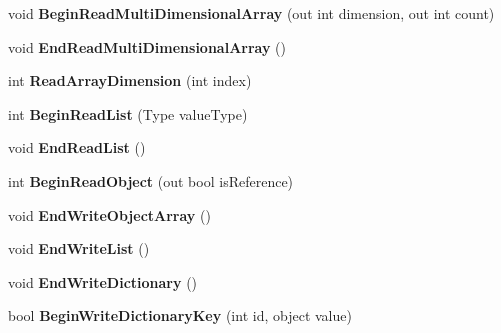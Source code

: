\begin{DoxyCompactItemize}
void {\bfseries Begin\+Read\+Multi\+Dimensional\+Array} (out int dimension, out int count)
\item 
\mbox{\label{class_serialization_1_1_binary_serializer_a174c1b111506dcf2be86461ab54b00bc}} 
void {\bfseries End\+Read\+Multi\+Dimensional\+Array} ()
\item 
\mbox{\label{class_serialization_1_1_binary_serializer_a82cdd27cb419e14f93f62e0947d3c109}} 
int {\bfseries Read\+Array\+Dimension} (int index)
\item 
\mbox{\label{class_serialization_1_1_binary_serializer_ace00f8cacc0ff79bb16197d641964e4c}} 
int {\bfseries Begin\+Read\+List} (Type value\+Type)
\item 
\mbox{\label{class_serialization_1_1_binary_serializer_aa4cb3eb6253054c5fe8bbebdc9c30c2f}} 
void {\bfseries End\+Read\+List} ()
\item 
\mbox{\label{class_serialization_1_1_binary_serializer_a44117e9f1e92e01af20f98cbd674f638}} 
int {\bfseries Begin\+Read\+Object} (out bool is\+Reference)
\item 
\mbox{\label{class_serialization_1_1_binary_serializer_acc36437ec400bb791655857fa98cfd40}} 
void {\bfseries End\+Write\+Object\+Array} ()
\item 
\mbox{\label{class_serialization_1_1_binary_serializer_a71b4595291913c4cdc62b860da2ffa7c}} 
void {\bfseries End\+Write\+List} ()
\item 
\mbox{\label{class_serialization_1_1_binary_serializer_a16b991b1614cfe83fbb7479b0de03368}} 
void {\bfseries End\+Write\+Dictionary} ()
\item 
\mbox{\label{class_serialization_1_1_binary_serializer_a07ccc4cc72e4c414f60de04ace5a6459}} 
bool {\bfseries Begin\+Write\+Dictionary\+Key} (int id, object value)
\item 

\end{DoxyCompactItemize}
